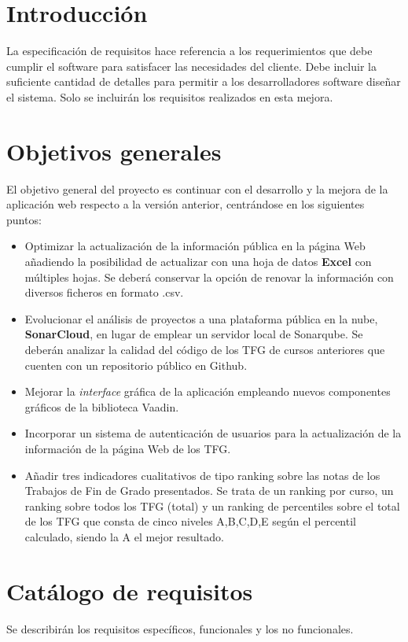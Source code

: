
\section{Introducción}
La especificación de requisitos hace referencia a los requerimientos que debe cumplir el software para satisfacer las necesidades del cliente. Debe incluir la suficiente cantidad de detalles para permitir a los desarrolladores software diseñar el sistema.
Solo se incluirán los requisitos realizados en esta mejora.

\section{Objetivos generales}
El objetivo general del proyecto es continuar con el desarrollo y la mejora de la aplicación web respecto a la versión anterior, centrándose en los siguientes puntos:
\begin{itemize}
	\item Optimizar la actualización de la información pública en la página Web añadiendo la posibilidad de actualizar con una hoja de datos \textbf{Excel} con múltiples hojas. Se deberá conservar la opción de renovar la información con diversos ficheros en formato .csv. 
	\item Evolucionar el análisis de proyectos a una plataforma pública en la nube, \textbf{SonarCloud}, en lugar de emplear un servidor local de Sonarqube. Se deberán analizar la calidad del código de los TFG de cursos anteriores que cuenten con un repositorio público en Github.
	\item Mejorar la \emph{interface} gráfica de la aplicación empleando nuevos componentes gráficos de la biblioteca Vaadin. 
	\item Incorporar un sistema de autenticación de usuarios para la actualización de la información de la página Web de los TFG.
	\item Añadir tres indicadores cualitativos de tipo ranking sobre las notas de los Trabajos de Fin de Grado presentados. Se trata de un ranking por curso, un ranking sobre todos los TFG (total) y un ranking de percentiles sobre el total de los TFG que consta de cinco niveles A,B,C,D,E según el percentil calculado, siendo la A el mejor resultado.
\end{itemize}

\section{Catálogo de requisitos}
Se describirán los requisitos específicos, funcionales y los no funcionales.

